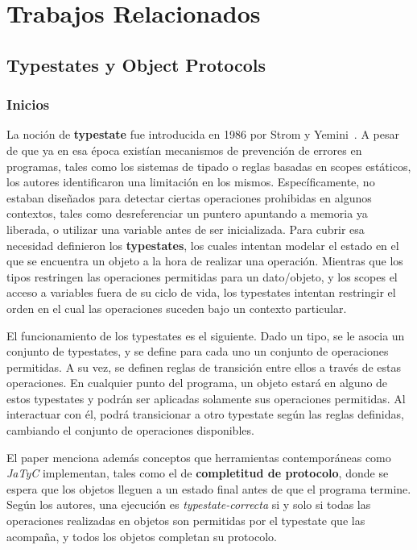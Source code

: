 \chapter{Trabajos Relacionados}

\section{Typestates y Object Protocols}

\subsection{Inicios}
\label{typestate-theory}

La noción de \textbf{typestate} fue introducida en 1986 por Strom y Yemini~\cite{typestate}. A pesar de que ya en esa época existían mecanismos de prevención de errores en programas, tales como los sistemas de tipado o reglas basadas en scopes estáticos, los autores identificaron una limitación en los mismos. Específicamente, no estaban diseñados para detectar ciertas operaciones prohibidas en algunos contextos, tales como desreferenciar un puntero apuntando a memoria ya liberada, o utilizar una variable antes de ser inicializada. Para cubrir esa necesidad definieron los \textbf{typestates}, los cuales intentan modelar el estado en el que se encuentra un objeto a la hora de realizar una operación. Mientras que los tipos restringen las operaciones permitidas para un dato/objeto, y los scopes el acceso a variables fuera de su ciclo de vida, los typestates intentan restringir el orden en el cual las operaciones suceden bajo un contexto particular.

El funcionamiento de los typestates es el siguiente. Dado un tipo, se le asocia un conjunto de typestates, y se define para cada uno un conjunto de operaciones permitidas. A su vez, se definen reglas de transición entre ellos a través de estas operaciones. En cualquier punto del programa, un objeto estará en alguno de estos typestates y podrán ser aplicadas solamente sus operaciones permitidas. Al interactuar con él, podrá transicionar a otro typestate según las reglas definidas, cambiando el conjunto de operaciones disponibles.

El paper menciona además conceptos que herramientas contemporáneas como \textit{JaTyC} implementan, tales como el de \textbf{completitud de protocolo}, donde se espera que los objetos lleguen a un estado final antes de que el programa termine. Según los autores, una ejecución es \textit{typestate-correcta} si y solo si todas las operaciones realizadas en objetos son permitidas por el typestate que las acompaña, y todos los objetos completan su protocolo.

